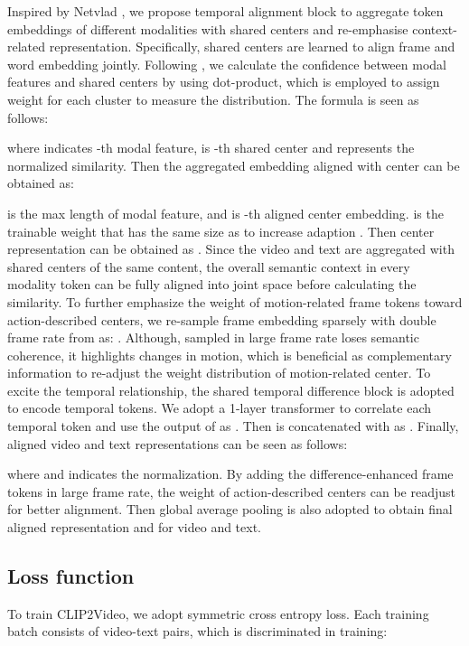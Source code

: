 \documentclass[final]{cvpr}
\begin{document}
Inspired by Netvlad \cite{arandjelovic2016netvlad}, we propose temporal alignment block to aggregate token embeddings of different modalities with shared centers and re-emphasise context-related representation. Specifically,  shared centers  are learned to align frame and word embedding jointly. Following \cite{arandjelovic2016netvlad}, we calculate the confidence between modal features and shared centers by using dot-product, which is employed to assign weight for each cluster to measure the distribution. The formula is seen as follows:
\vspace{-0.2cm}

where  indicates -th modal feature,  is -th shared center and  represents the normalized similarity. Then the aggregated embedding aligned with center  can be obtained as:
\vspace{-0.2cm}

 is the max length of modal feature, and  is -th aligned center embedding.  is the trainable weight that has the same size as  to increase adaption \cite{arandjelovic2016netvlad}. Then center representation can be obtained as . Since the video and text are aggregated with shared centers of the same content, the overall semantic context in every modality token can be fully aligned into joint space before calculating the similarity. To further emphasize the weight of motion-related frame tokens toward action-described centers, we re-sample frame embedding sparsely with double frame rate from  as: . Although,  sampled in large frame rate loses semantic coherence, it highlights changes in motion, which is beneficial as complementary information to re-adjust the weight distribution of motion-related center. To excite the temporal relationship, the shared temporal difference block is adopted to encode temporal tokens. We adopt a 1-layer transformer to correlate each temporal token and use the output of  as . Then  is concatenated with  as . Finally, aligned video and text representations can be seen as follows: 

where  and  indicates the  normalization. By adding the difference-enhanced frame tokens in large frame rate, the weight of action-described centers can be readjust for better alignment. Then global average pooling is also adopted to obtain final aligned representation  and  for video and text.


\subsection{Loss function}
To train CLIP2Video, we adopt symmetric cross entropy loss. Each training batch  consists of  video-text pairs, which is discriminated in training:
\end{document}
